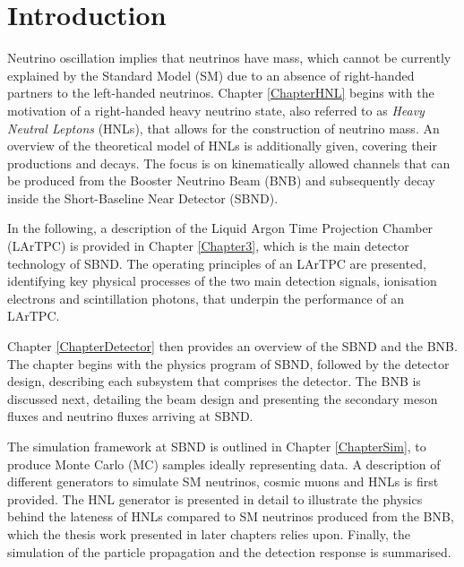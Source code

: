 
\chapter{Introduction}  %

Neutrino oscillation implies that neutrinos have mass, which cannot be currently explained by the Standard Model (SM) due to an absence of right-handed partners to the left-handed neutrinos.  
Chapter \ref{ChapterHNL}  begins with the motivation of a right-handed heavy neutrino state, also referred to as \textit{Heavy Neutral Leptons} (HNLs), that allows for the construction of neutrino mass.
An overview of the theoretical model of HNLs is additionally given, covering their productions and decays.
The focus is on kinematically allowed channels that can be produced from the Booster Neutrino Beam (BNB) and subsequently decay inside the Short-Baseline Near Detector (SBND).

In the following, a description of the Liquid Argon Time Projection Chamber (LArTPC) is provided in Chapter \ref{Chapter3}, which is the main detector technology of SBND.
The operating principles of an LArTPC are presented, identifying key physical processes of the two main detection signals, ionisation electrons and scintillation photons, that underpin the performance of an LArTPC.

Chapter \ref{ChapterDetector} then provides an overview of the SBND and the BNB.
The chapter begins with the physics program of SBND, followed by the detector design, describing each subsystem that comprises the detector.
The BNB is discussed next, detailing the beam design and presenting the secondary meson fluxes and neutrino fluxes arriving at SBND.

The simulation framework at SBND is outlined in Chapter \ref{ChapterSim}, to produce Monte Carlo (MC) samples ideally representing data.
A description of different generators to simulate SM neutrinos, cosmic muons and HNLs is first provided.
The HNL generator is presented in detail to illustrate the physics behind the lateness of HNLs compared to SM neutrinos produced from the BNB, which the thesis work presented in later chapters relies upon.  
Finally, the simulation of the particle propagation and the detection response is summarised.

